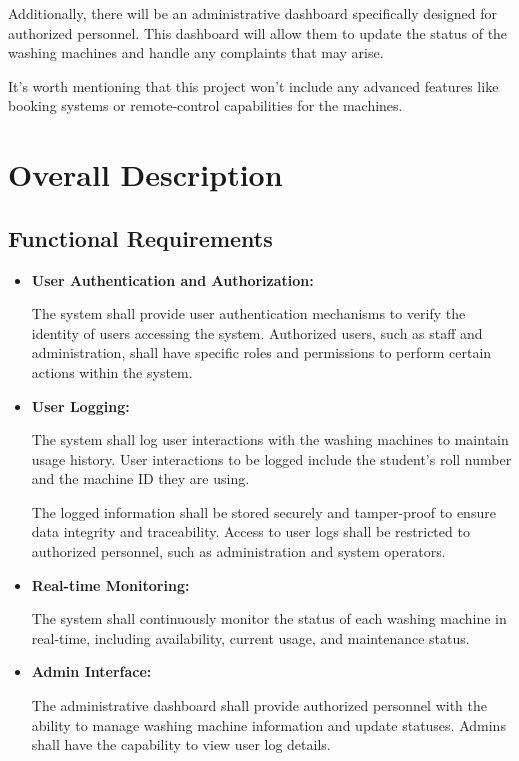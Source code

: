 \documentclass{article}
\begin{document}
Additionally, there will be an administrative dashboard specifically designed for authorized personnel. This dashboard will allow them to update the status of the washing machines and handle any complaints that may arise.  

It's worth mentioning that this project won't include any advanced features like booking systems or remote-control capabilities for the machines. 
\section{Overall Description}
\subsection{Functional Requirements}
\begin{itemize}
\item\textbf{User Authentication and Authorization:} 

The system shall provide user authentication mechanisms to verify the identity of users accessing the system. Authorized users, such as staff and administration, shall have specific roles and permissions to perform certain actions within the system. 

\item\textbf{User Logging:}

The system shall log user interactions with the washing machines to maintain usage history. User interactions to be logged include the student's roll number and the machine ID they are using.  

The logged information shall be stored securely and tamper-proof to ensure data integrity and traceability. Access to user logs shall be restricted to authorized personnel, such as administration and system operators.

\item\textbf{Real-time Monitoring:}

The system shall continuously monitor the status of each washing machine in real-time, including availability, current usage, and maintenance status. 

\item\textbf{Admin Interface:}

The administrative dashboard shall provide authorized personnel with the ability to manage washing machine information and update statuses. Admins shall have the capability to view user log details.

\end{itemize}
\end{document}

